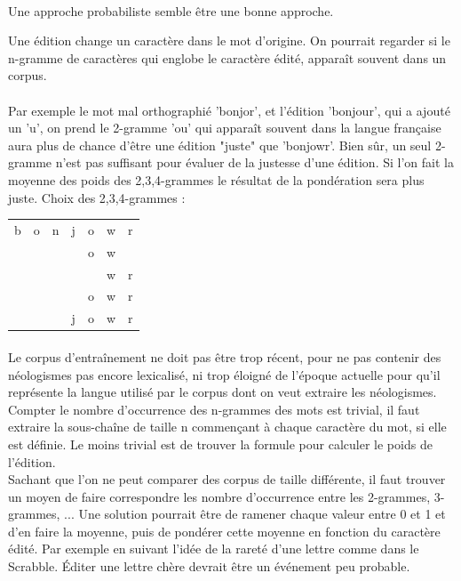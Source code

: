 \documentclass{article}
\begin{document}
\paragraph*{}
Une approche probabiliste semble être une bonne approche.\newline

Une édition change un caractère dans le mot d'origine. On pourrait regarder si le n-gramme de caractères qui englobe le caractère édité, apparaît souvent dans un corpus.
\paragraph*{}
Par exemple le mot mal orthographié 'bonjor', et l'édition 'bonjour', qui a ajouté un 'u', on prend le 2-gramme 'ou' qui apparaît souvent dans la langue française aura plus de chance d'être une édition "juste" que 'bonjowr'. Bien sûr, un seul 2-gramme n'est pas suffisant pour évaluer de la justesse d'une édition. Si l'on fait la moyenne des poids des 2,3,4-grammes le résultat de la pondération sera plus juste. Choix des 2,3,4-grammes :\\
\begin{tabular}{ccccccc}
b&o&n&j&o&w&r\\
 & & & &o&w&\\
 & & & & &w&r\\
 & & & &o&w&r\\
 & & &j&o&w&r\\
\end{tabular}
\paragraph*{}
Le corpus d’entraînement ne doit pas être trop récent, pour ne pas contenir des néologismes pas encore lexicalisé, ni trop éloigné de l'époque actuelle pour qu'il représente la langue utilisé par le corpus dont on veut extraire les néologismes. Compter le nombre d’occurrence des n-grammes des mots est trivial, il faut extraire la sous-chaîne de taille n commençant à chaque caractère du mot, si elle est définie. Le moins trivial est de trouver la formule pour calculer le poids de l'édition.\\
Sachant que l'on ne peut comparer des corpus de taille différente, il faut trouver un moyen de faire correspondre les nombre d'occurrence entre les 2-grammes, 3-grammes, ... Une solution pourrait être de ramener chaque valeur entre 0 et 1 et d'en faire la moyenne, puis de pondérer cette moyenne en fonction du caractère édité. Par exemple en suivant l'idée de la rareté d'une lettre comme dans le Scrabble. Éditer une lettre chère devrait être un événement peu probable.
\end{document}
